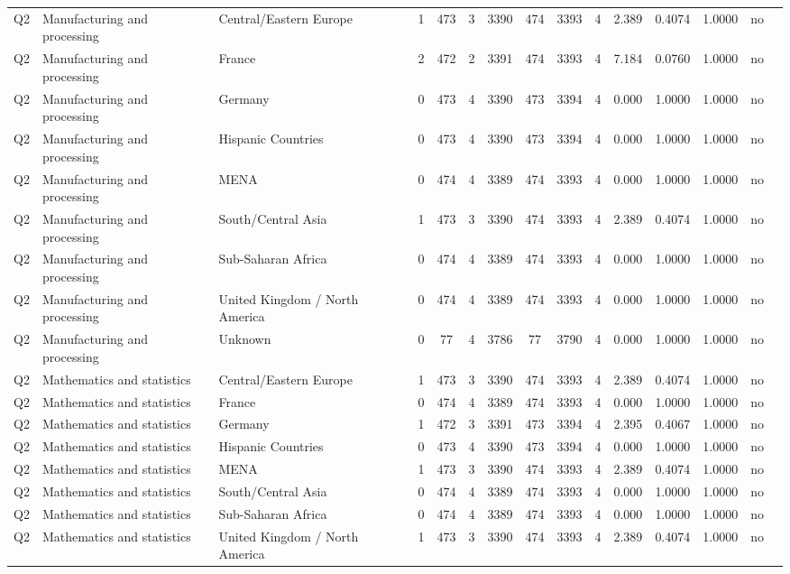 \begin{longtable}{lllrcccccccccll}
Q2 & Manufacturing and processing & Central/Eastern Europe & 1 & 473 & 3 & 3390 & 474 & 3393 & 4 & 2.389 & 0.4074 & 1.0000 & no \\
Q2 & Manufacturing and processing & France & 2 & 472 & 2 & 3391 & 474 & 3393 & 4 & 7.184 & 0.0760 & 1.0000 & no \\
Q2 & Manufacturing and processing & Germany & 0 & 473 & 4 & 3390 & 473 & 3394 & 4 & 0.000 & 1.0000 & 1.0000 & no \\
Q2 & Manufacturing and processing & Hispanic Countries & 0 & 473 & 4 & 3390 & 473 & 3394 & 4 & 0.000 & 1.0000 & 1.0000 & no \\
Q2 & Manufacturing and processing & MENA & 0 & 474 & 4 & 3389 & 474 & 3393 & 4 & 0.000 & 1.0000 & 1.0000 & no \\
Q2 & Manufacturing and processing & South/Central Asia & 1 & 473 & 3 & 3390 & 474 & 3393 & 4 & 2.389 & 0.4074 & 1.0000 & no \\
Q2 & Manufacturing and processing & Sub-Saharan Africa & 0 & 474 & 4 & 3389 & 474 & 3393 & 4 & 0.000 & 1.0000 & 1.0000 & no \\
Q2 & Manufacturing and processing & United Kingdom / North America & 0 & 474 & 4 & 3389 & 474 & 3393 & 4 & 0.000 & 1.0000 & 1.0000 & no \\
Q2 & Manufacturing and processing & Unknown & 0 & 77 & 4 & 3786 & 77 & 3790 & 4 & 0.000 & 1.0000 & 1.0000 & no \\
Q2 & Mathematics and statistics & Central/Eastern Europe & 1 & 473 & 3 & 3390 & 474 & 3393 & 4 & 2.389 & 0.4074 & 1.0000 & no \\
Q2 & Mathematics and statistics & France & 0 & 474 & 4 & 3389 & 474 & 3393 & 4 & 0.000 & 1.0000 & 1.0000 & no \\
Q2 & Mathematics and statistics & Germany & 1 & 472 & 3 & 3391 & 473 & 3394 & 4 & 2.395 & 0.4067 & 1.0000 & no \\
Q2 & Mathematics and statistics & Hispanic Countries & 0 & 473 & 4 & 3390 & 473 & 3394 & 4 & 0.000 & 1.0000 & 1.0000 & no \\
Q2 & Mathematics and statistics & MENA & 1 & 473 & 3 & 3390 & 474 & 3393 & 4 & 2.389 & 0.4074 & 1.0000 & no \\
Q2 & Mathematics and statistics & South/Central Asia & 0 & 474 & 4 & 3389 & 474 & 3393 & 4 & 0.000 & 1.0000 & 1.0000 & no \\
Q2 & Mathematics and statistics & Sub-Saharan Africa & 0 & 474 & 4 & 3389 & 474 & 3393 & 4 & 0.000 & 1.0000 & 1.0000 & no \\
Q2 & Mathematics and statistics & United Kingdom / North America & 1 & 473 & 3 & 3390 & 474 & 3393 & 4 & 2.389 & 0.4074 & 1.0000 & no \\

\end{longtable}
